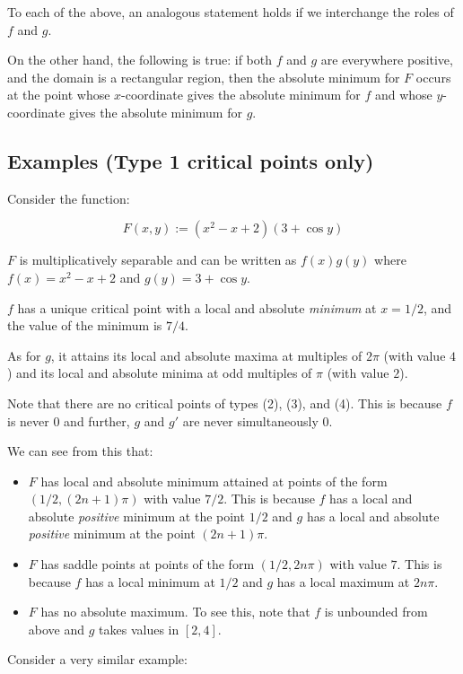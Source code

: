 \documentclass[10pt]{amsart}
\begin{document}
To each of the above, an analogous statement holds if we interchange
the roles of $f$ and $g$.

On the other hand, the following is true: if both $f$ and $g$ are
everywhere positive, and the domain is a rectangular region, then the
absolute minimum for $F$ occurs at the point whose $x$-coordinate
gives the absolute minimum for $f$ and whose $y$-coordinate gives the
absolute minimum for $g$.

\subsection{Examples (Type 1 critical points only)}

Consider the function:

$$F(x,y) := (x^2 - x + 2)(3 + \cos y)$$

$F$ is multiplicatively separable and can be written as $f(x)g(y)$
where $f(x) = x^2 - x + 2$ and $g(y) = 3 + \cos y$.

$f$ has a unique critical point with a local and absolute {\em
minimum} at $x = 1/2$, and the value of the minimum is $7/4$.

As for $g$, it attains its local and absolute maxima at multiples of
$2\pi$ (with value $4$) and its local and absolute minima at odd
multiples of $\pi$ (with value $2$).

Note that there are no critical points of types (2), (3), and
(4). This is because $f$ is never $0$ and further, $g$ and $g'$ are
never simultaneously $0$.

We can see from this that:

\begin{itemize}
\item $F$ has local and absolute minimum attained at points of the
  form $(1/2,(2n + 1)\pi)$ with value $7/2$. This is because $f$ has a
  local and absolute {\em positive} minimum at the point $1/2$ and $g$
  has a local and absolute {\em positive} minimum at the point $(2n +
  1)\pi$.
\item $F$ has saddle points at points of the form $(1/2,2n\pi)$ with
  value $7$. This is because $f$ has a local minimum at $1/2$ and $g$
  has a local maximum at $2n\pi$.
\item $F$ has no absolute maximum. To see this, note that $f$ is
  unbounded from above and $g$ takes values in $[2,4]$.
\end{itemize}

Consider a very similar example:
\end{document}
